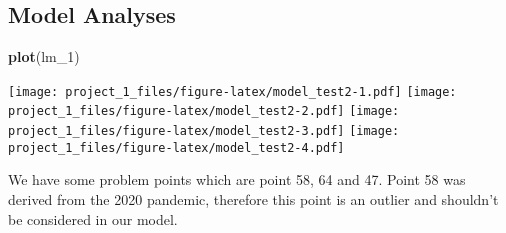 \documentclass[
]{article}
\newenvironment{Shaded}{\begin{snugshade}}{\end{snugshade}}
\newcommand{\FunctionTok}[1]{\textcolor[rgb]{0.13,0.29,0.53}{\textbf{#1}}}
\newcommand{\NormalTok}[1]{#1}
\begin{document}
\subsection{Model Analyses}\label{model-analyses}

\begin{Shaded}
\begin{Highlighting}[]
\FunctionTok{plot}\NormalTok{(lm\_1)}
\end{Highlighting}
\end{Shaded}

\texttt{[image: project\_1\_files/figure-latex/model\_test2-1.pdf]}
\texttt{[image: project\_1\_files/figure-latex/model\_test2-2.pdf]}
\texttt{[image: project\_1\_files/figure-latex/model\_test2-3.pdf]}
\texttt{[image: project\_1\_files/figure-latex/model\_test2-4.pdf]}

We have some problem points which are point 58, 64 and 47. Point 58 was
derived from the 2020 pandemic, therefore this point is an outlier and
shouldn't be considered in our model.
\end{document}
